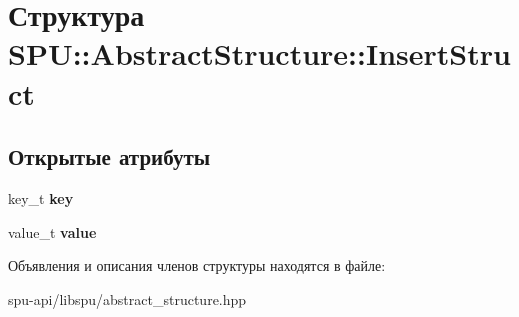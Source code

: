\hypertarget{struct_s_p_u_1_1_abstract_structure_1_1_insert_struct}{}\section{Структура S\+PU\+:\+:Abstract\+Structure\+:\+:Insert\+Struct}
\label{struct_s_p_u_1_1_abstract_structure_1_1_insert_struct}
\subsection*{Открытые атрибуты}
\begin{DoxyCompactItemize}
\item 
\mbox{\label{struct_s_p_u_1_1_abstract_structure_1_1_insert_struct_abf1aea5844ee2b375fced121ad49187d}} 
key\+\_\+t {\bfseries key}
\item 
\mbox{\label{struct_s_p_u_1_1_abstract_structure_1_1_insert_struct_a40b28c3114c043363f3c3dc024d016cf}} 
value\+\_\+t {\bfseries value}
\end{DoxyCompactItemize}


Объявления и описания членов структуры находятся в файле\+:\begin{DoxyCompactItemize}
\item 
spu-\/api/libspu/abstract\+\_\+structure.\+hpp\end{DoxyCompactItemize}
